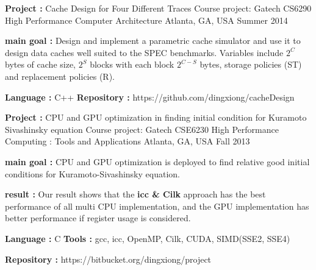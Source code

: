 \begin{cventries}
\cventry
{\textbf{Project :} Cache Design for Four Different Traces} 
{Course project: Gatech CS6290 High Performance Computer Architecture} 
{Atlanta, GA, USA} %
{Summer 2014} %
{
  \begin{cvitems}
  \item {\textbf{main goal :} Design and implement a parametric cache
      simulator and use it to design data caches well suited to the SPEC benchmarks. 
      Variables include $2^C$ bytes of cache size, $2^S$ blocks with each block $2^{C-S}$ bytes,
      storage policies (ST) and replacement policies (R).
    }
  \item {\textbf{Language :} C++  \quad
      \textbf{Repository :} {\color{red} https://github.com/dingxiong/cacheDesign}
    }
  \end{cvitems}
}

\cventry
{\textbf{Project :} CPU and GPU optimization in finding initial 
  condition for Kuramoto Sivashinsky equation} 
{Course project: Gatech CSE6230 High Performance Computing : Tools and Applications} 
{Atlanta, GA, USA} %
{Fall 2013} %
{
  \begin{cvitems}
  \item {\textbf{main goal :} CPU and GPU optimization is deployed to find relative 
      good initial conditions for Kuramoto-Sivashinsky equation. 
    }
    \item {\textbf{result : }Our result shows that the 
      \textbf{icc \& Cilk} approach has the best performance of all multi CPU implementation, and
      the GPU implementation has better performance if register usage is considered.
    }
  \item {\textbf{Language :} C \quad 
      \textbf{Tools : } gcc, icc, OpenMP, Cilk, CUDA, SIMD(SSE2, SSE4)
    }
  \item {
      \textbf{Repository :} {\color{red} https://bitbucket.org/dingxiong/project}
    }
  \end{cvitems}
}







\end{cventries}